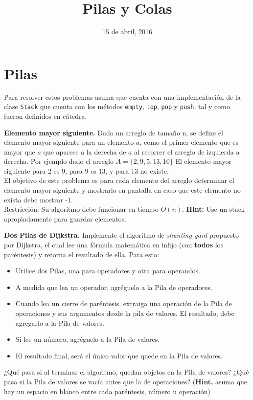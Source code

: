 \documentclass[dcc, usedate]{fcfmcourse}
\title[5]{Pilas y Colas}
\date{15 de abril, 2016}
\begin{document}
\maketitle

\section*{Pilas}
Para resolver estos problemas asuma que cuenta con una implementación de la clase \texttt{Stack} que cuenta con los métodos \texttt{empty}, \texttt{top}, \texttt{pop} y \texttt{push}, tal y como fueron definidos en cátedra.\\
\begin{problems}

\problem \textbf{Elemento mayor siguiente.} Dado un arreglo de tamaño n, se define el elemento mayor siguiente para un elemento $a$, como el primer elemento que es mayor que $a$ que aparece a la derecha de $a$ al recorrer el arreglo de izquierda a derecha. Por ejemplo dado el arreglo $A=\{ 2, 9, 5, 13, 10 \}$ El elemento mayor siguiente para 2 es 9, para 9 es 13, y para 13 no existe. \\

El objetivo de este problema es para cada elemento del arreglo determinar el elemento mayor siguiente y mostrarlo en pantalla en caso que este elemento no exista debe mostrar -1. \\

Restricción: Su algoritmo debe funcionar en tiempo $O(n)$. \textbf{Hint:} Use un stack apropiadamente para guardar elementos. 

\problem \textbf{Dos Pilas de Dijkstra.} Implemente el algoritmo de \textit{shunting yard} propuesto por Dijkstra, el cual lee una fórmula matemática en infijo (con \textbf{todos} los paréntesis) y retorna el resultado de ella.
Para esto:
\begin{itemize}
    \item Utilice dos Pilas, una para operadores y otra para operandos.
    \item A medida que lea un operador, agréguelo a la Pila de operadores.
    \item Cuando lea un cierre de paréntesis, extraiga una operación de la Pila de operaciones y sus argumentos desde la pila de valores. El resultado, debe agregarlo a la Pila de valores.
    \item Si lee un número, agréguelo a la Pila de valores.
    \item El resultado final, será el único valor que quede en la Pila de valores.
\end{itemize}
¿Qué pasa si al terminar el algoritmo, quedan objetos en la Pila de valores? ¿Qué pasa si la Pila de valores se vacía antes que la de operaciones?
(\textbf{Hint.} asuma que hay un espacio en blanco entre cada paréntesis, número u operación)



\end{problems}
\end{document}
